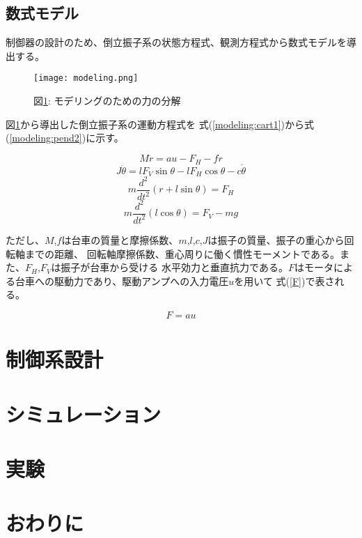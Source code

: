 \documentclass[a4j,11pt,twoside]{jbook}
\begin{document}
\section{数式モデル}
制御器の設計のため、倒立振子系の状態方程式、観測方程式から数式モデルを導出する。
\begin{figure}[htbp]
    \begin{center}
        \texttt{[image: modeling.png]}
        \caption{図\ref{modeling}: モデリングのための力の分解}
        \label{modeling}
    \end{center}
\end{figure}

図\ref{modeling}から導出した倒立振子系の運動方程式を
式(\ref{modeling:cart1})から式(\ref{modeling:pend2})に示す。

\begin{equation}
    M \ddot r = au - F_{H} - f \dot r
    \label{modeling:cart1}
\end{equation}
\begin{equation}
    J \ddot \theta = lF_{V}\sin \theta - lF_{H}\cos \theta - c \dot \theta
    \label{modeling:pend1}
\end{equation}
\begin{equation}
    m\frac{d^2}{dt^2}(r + l\sin \theta) = F_{H}
    \label{modeling:cart2}
\end{equation}
\begin{equation}
    m\frac{d^2}{dt^2}(l\cos \theta) = F_{V} - mg
    \label{modeling:pend2}
\end{equation}

ただし、$M$,$f$は台車の質量と摩擦係数、$m$,$l$,$c$,$J$は振子の質量、振子の重心から回転軸までの距離、
回転軸摩擦係数、重心周りに働く慣性モーメントである。また、$F_{H}$,$F_{V}$は振子が台車から受ける
水平効力と垂直抗力である。$F$はモータによる台車への駆動力であり、駆動アンプへの入力電圧$u$を用いて
式(\ref{F})で表される。

\begin{equation}
    F = au
    \label{F}
\end{equation}

\chapter{制御系設計}

\chapter{シミュレーション}

\chapter{実験}

\chapter{おわりに}
\end{document}
